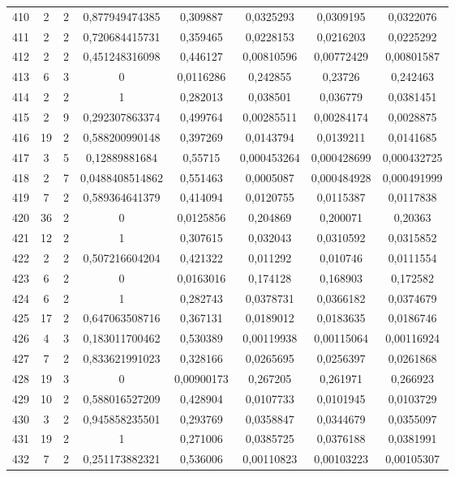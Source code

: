 \begin{longtable}{|c|c|c|c|c|c|c|c|}
410 & 2 & 2 & 0,877949474385 & 0,309887 & 0,0325293 & 0,0309195 & 0,0322076  \\
411 & 2 & 2 & 0,720684415731 & 0,359465 & 0,0228153 & 0,0216203 & 0,0225292  \\
412 & 2 & 2 & 0,451248316098 & 0,446127 & 0,00810596 & 0,00772429 & 0,00801587  \\
413 & 6 & 3 & 0 & 0,0116286 & 0,242855 & 0,23726 & 0,242463  \\
414 & 2 & 2 & 1 & 0,282013 & 0,038501 & 0,036779 & 0,0381451  \\
415 & 2 & 9 & 0,292307863374 & 0,499764 & 0,00285511 & 0,00284174 & 0,0028875  \\
416 & 19 & 2 & 0,588200990148 & 0,397269 & 0,0143794 & 0,0139211 & 0,0141685  \\
417 & 3 & 5 & 0,12889881684 & 0,55715 & 0,000453264 & 0,000428699 & 0,000432725  \\
418 & 2 & 7 & 0,0488408514862 & 0,551463 & 0,0005087 & 0,000484928 & 0,000491999  \\
419 & 7 & 2 & 0,589364641379 & 0,414094 & 0,0120755 & 0,0115387 & 0,0117838  \\
420 & 36 & 2 & 0 & 0,0125856 & 0,204869 & 0,200071 & 0,20363  \\
421 & 12 & 2 & 1 & 0,307615 & 0,032043 & 0,0310592 & 0,0315852  \\
422 & 2 & 2 & 0,507216604204 & 0,421322 & 0,011292 & 0,010746 & 0,0111554  \\
423 & 6 & 2 & 0 & 0,0163016 & 0,174128 & 0,168903 & 0,172582  \\
424 & 6 & 2 & 1 & 0,282743 & 0,0378731 & 0,0366182 & 0,0374679  \\
425 & 17 & 2 & 0,647063508716 & 0,367131 & 0,0189012 & 0,0183635 & 0,0186746  \\
426 & 4 & 3 & 0,183011700462 & 0,530389 & 0,00119938 & 0,00115064 & 0,00116924  \\
427 & 7 & 2 & 0,833621991023 & 0,328166 & 0,0265695 & 0,0256397 & 0,0261868  \\
428 & 19 & 3 & 0 & 0,00900173 & 0,267205 & 0,261971 & 0,266923  \\
429 & 10 & 2 & 0,588016527209 & 0,428904 & 0,0107733 & 0,0101945 & 0,0103729  \\
430 & 3 & 2 & 0,945858235501 & 0,293769 & 0,0358847 & 0,0344679 & 0,0355097  \\
431 & 19 & 2 & 1 & 0,271006 & 0,0385725 & 0,0376188 & 0,0381991  \\
432 & 7 & 2 & 0,251173882321 & 0,536006 & 0,00110823 & 0,00103223 & 0,00105307  \\

\end{longtable}
